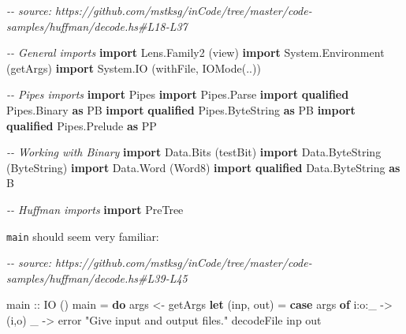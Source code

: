 \documentclass[]{article}
\newenvironment{Shaded}{}{}
\newcommand{\CommentTok}[1]{\textcolor[rgb]{0.38,0.63,0.69}{\textit{#1}}}
\newcommand{\DataTypeTok}[1]{\textcolor[rgb]{0.56,0.13,0.00}{#1}}
\newcommand{\FunctionTok}[1]{\textcolor[rgb]{0.02,0.16,0.49}{#1}}
\newcommand{\KeywordTok}[1]{\textcolor[rgb]{0.00,0.44,0.13}{\textbf{#1}}}
\newcommand{\NormalTok}[1]{#1}
\newcommand{\OperatorTok}[1]{\textcolor[rgb]{0.40,0.40,0.40}{#1}}
\newcommand{\OtherTok}[1]{\textcolor[rgb]{0.00,0.44,0.13}{#1}}
\newcommand{\StringTok}[1]{\textcolor[rgb]{0.25,0.44,0.63}{#1}}
\begin{document}
\begin{Shaded}
\begin{Highlighting}[]
\CommentTok{{-}{-} source: https://github.com/mstksg/inCode/tree/master/code{-}samples/huffman/decode.hs\#L18{-}L37}

\CommentTok{{-}{-} General imports}
\KeywordTok{import} \DataTypeTok{Lens.Family2}\NormalTok{       (view)}
\KeywordTok{import} \DataTypeTok{System.Environment}\NormalTok{ (getArgs)}
\KeywordTok{import} \DataTypeTok{System.IO}\NormalTok{          (withFile, }\DataTypeTok{IOMode}\NormalTok{(..))}

\CommentTok{{-}{-} Pipes imports}
\KeywordTok{import} \DataTypeTok{Pipes}
\KeywordTok{import} \DataTypeTok{Pipes.Parse}
\KeywordTok{import} \KeywordTok{qualified} \DataTypeTok{Pipes.Binary}     \KeywordTok{as} \DataTypeTok{PB}
\KeywordTok{import} \KeywordTok{qualified} \DataTypeTok{Pipes.ByteString} \KeywordTok{as} \DataTypeTok{PB}
\KeywordTok{import} \KeywordTok{qualified} \DataTypeTok{Pipes.Prelude}    \KeywordTok{as} \DataTypeTok{PP}

\CommentTok{{-}{-} Working with Binary}
\KeywordTok{import} \DataTypeTok{Data.Bits}\NormalTok{                 (testBit)}
\KeywordTok{import} \DataTypeTok{Data.ByteString}\NormalTok{           (}\DataTypeTok{ByteString}\NormalTok{)}
\KeywordTok{import} \DataTypeTok{Data.Word}\NormalTok{                 (}\DataTypeTok{Word8}\NormalTok{)}
\KeywordTok{import} \KeywordTok{qualified} \DataTypeTok{Data.ByteString} \KeywordTok{as} \DataTypeTok{B}

\CommentTok{{-}{-} Huffman imports}
\KeywordTok{import} \DataTypeTok{PreTree}
\end{Highlighting}
\end{Shaded}

\texttt{main} should seem very familiar:

\begin{Shaded}
\begin{Highlighting}[]
\CommentTok{{-}{-} source: https://github.com/mstksg/inCode/tree/master/code{-}samples/huffman/decode.hs\#L39{-}L45}

\OtherTok{main ::} \DataTypeTok{IO}\NormalTok{ ()}
\NormalTok{main }\OtherTok{=} \KeywordTok{do}
\NormalTok{    args     }\OtherTok{\textless{}{-}}\NormalTok{ getArgs}
    \KeywordTok{let}\NormalTok{ (inp, out)  }\OtherTok{=} \KeywordTok{case}\NormalTok{ args }\KeywordTok{of}
\NormalTok{                        i}\OperatorTok{:}\NormalTok{o}\OperatorTok{:}\NormalTok{\_      }\OtherTok{{-}\textgreater{}}\NormalTok{ (i,o)}
\NormalTok{                        \_          }\OtherTok{{-}\textgreater{}} \FunctionTok{error} \StringTok{"Give input and output files."}
\NormalTok{    decodeFile inp out}
\end{Highlighting}
\end{Shaded}
\end{document}
